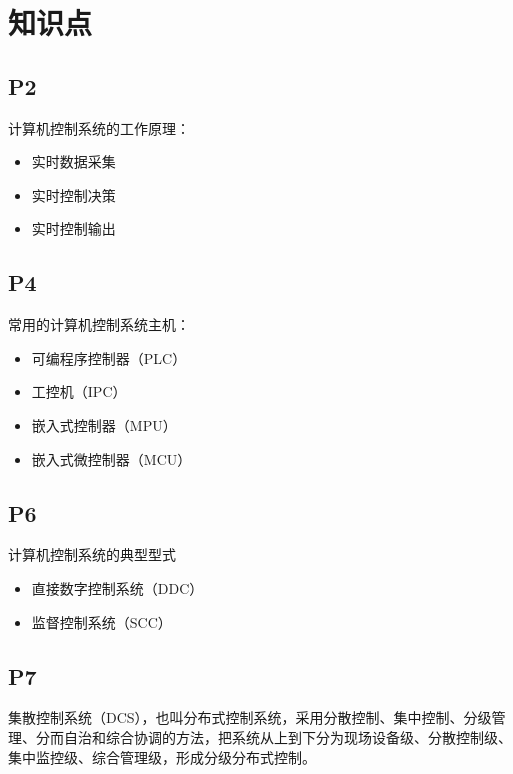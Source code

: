 \documentclass[zihao=-4
]{ctexart}%
\begin{document}
\hypertarget{header-n48}{%
\section{知识点}\label{header-n48}}

\hypertarget{header-n49}{%
\subsection{P2}\label{header-n49}}

计算机控制系统的工作原理：

\begin{itemize}
\item
  实时数据采集
\item
  实时控制决策
\item
  实时控制输出
\end{itemize}

\hypertarget{header-n58}{%
\subsection{P4}\label{header-n58}}

常用的计算机控制系统主机：

\begin{itemize}
\item
  可编程序控制器（PLC）
\item
  工控机（IPC）
\item
  嵌入式控制器（MPU）
\item
  嵌入式微控制器（MCU）
\end{itemize}

\hypertarget{header-n69}{%
\subsection{P6}\label{header-n69}}

计算机控制系统的典型型式

\begin{itemize}
\item
  直接数字控制系统（DDC）
\item
  监督控制系统（SCC）
\end{itemize}

\hypertarget{header-n76}{%
\subsection{P7}\label{header-n76}}

集散控制系统（DCS），也叫分布式控制系统，采用分散控制、集中控制、分级管理、分而自治和综合协调的方法，把系统从上到下分为现场设备级、分散控制级、集中监控级、综合管理级，形成分级分布式控制。
\end{document}

